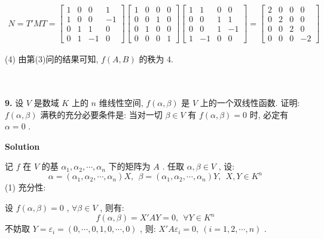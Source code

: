 \documentclass[11pt,a4paper,openany,oneside]{book}
\newcommand\Solution{\noindent\textbf{\textsf{Solution}}\par\medskip}
\begin{document}
\begin{gather*}
N = T'MT=
\begin{bmatrix}
1  &  0  &  0  &  1  \\
1  &  0  &  0  &  -1  \\
0  &  1  &  1  &  0  \\
0  &  1  &  -1 &  0
\end{bmatrix}
\begin{bmatrix}
1  &  0  &  0  &  0  \\
0  &  0  &  1  &  0  \\
0  &  1  &  0  &  0  \\
0  &  0  &  0  &  1
\end{bmatrix}
\begin{bmatrix}
1  &  1  &  0  &  0 \\
0  &  0  &  1  &  1  \\
0  &  0  &  1  & -1  \\
1  & -1  &  0  &  0
\end{bmatrix}=
\begin{bmatrix}
2  &  0  &  0  &  0  \\
0  &  2  &  0  &  0  \\
0  &  0  &  2  &  0 \\
0  &  0  &  0  &  -2
\end{bmatrix}
\end{gather*}

(4) 由第(3)问的结果可知,  $ f(A,B) $ 的秩为 4. \\  \\  \\




\begin{myexample}
	\textbf{9.} 设 $ V $ 是数域 $ K $ 上的 $ n $ 维线性空间,  $ f(\alpha, \beta) $ 是 $ V $ 上的一个双线性函数. 证明:  $ f(\alpha, \beta) $ 满秩的充分必要条件是: 当对一切 $ \beta \in V $ 有 $ f(\alpha, \beta) = 0 $ 时, 必定有 $ \alpha = 0 $ .
\end{myexample}
\Solution 

记 $ f $ 在 $ V $ 的基 $ \alpha_1, \alpha_2, \cdots, \alpha_n $ 下的矩阵为 $ A $ . 任取 $ \alpha, \beta \in V $ , 设:
 $$  \alpha = (\alpha_1, \alpha_2, \cdots, \alpha_n)X, \ \ \beta = (\alpha_1, \alpha_2, \cdots, \alpha_n)Y, \ \ X, Y \in K^n  $$ 
(1) 充分性:

设 $ f(\alpha, \beta)=0 $ ,  $ \forall \beta \in V $ , 则有:
 $$  f(\alpha, \beta) = X'AY =0, \ \ \forall Y \in K^n  $$ 
不妨取 $ Y=\varepsilon_i = (0,\cdots,0,1,0,\cdots, 0) $ , 则: $ X'A\varepsilon_i = 0,\ (i=1, 2, \cdots, n) $ . 
\end{document}
